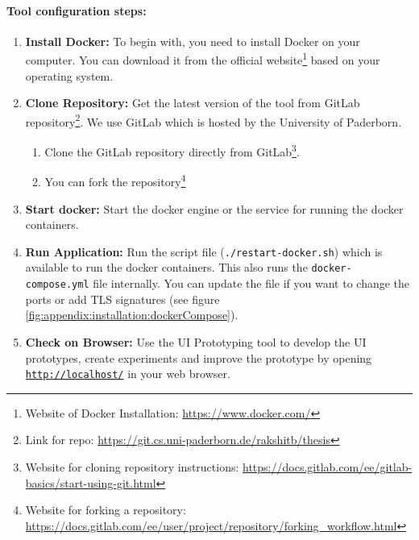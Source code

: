 \paragraph{Tool configuration steps:}

\begin{enumerate}
\item \textbf{Install Docker:} To begin with, you need to install Docker on your computer. 
You can download it from the official website\footnote{Website of Docker Installation: \url{https://www.docker.com/}} based on your operating system.
\clearpage
\item \textbf{Clone Repository:} Get the latest version of the tool from GitLab repository\footnote{Link for repo: \url{https://git.cs.uni-paderborn.de/rakshitb/thesis}}. We use GitLab which is hosted by the University of Paderborn.
\begin{enumerate}
	\item Clone the GitLab repository directly from GitLab\footnote{Website for cloning repository instructions: \url{https://docs.gitlab.com/ee/gitlab-basics/start-using-git.html}}.
	\item You can fork the repository\footnote{Website for forking a repository: \url{https://docs.gitlab.com/ee/user/project/repository/forking_workflow.html}} 
\end{enumerate}
\item \textbf{Start docker:} Start the docker engine or the service for running the docker containers.
\item \textbf{Run Application:} Run the script file (\texttt{./restart-docker.sh}) which is available to run the docker containers. This also runs the \texttt{docker-compose.yml} file internally. You can update the file if you want to change the ports or add TLS signatures (see figure \ref{fig:appendix:installation:dockerCompose}).
\item \textbf{Check on Browser:} Use the UI Prototyping tool to develop the UI prototypes, create experiments and improve the prototype by opening \texttt{\url{http://localhost/}} in your web browser.
\end{enumerate}
